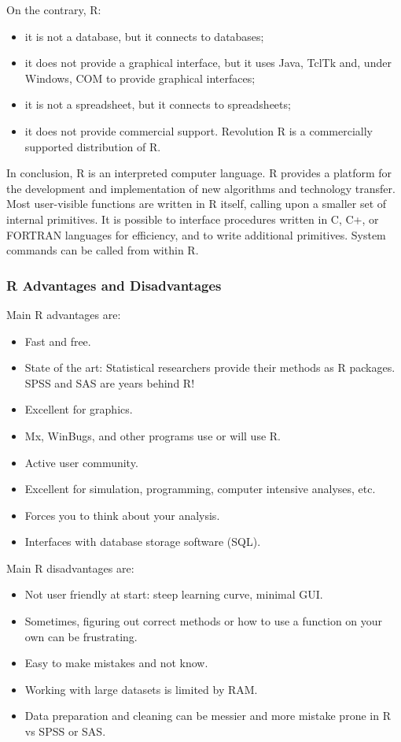 \documentclass[]{book}
\providecommand{\tightlist}{%
  \setlength{\itemsep}{0pt}\setlength{\parskip}{0pt}}
\def\tightlist{}
\begin{document}
On the contrary, R:

\begin{itemize}
\tightlist
\item
  it is not a database, but it connects to databases;
\item
  it does not provide a graphical interface, but it uses Java, TclTk
  and, under Windows, COM to provide graphical interfaces;
\item
  it is not a spreadsheet, but it connects to spreadsheets;
\item
  it does not provide commercial support. Revolution R is a commercially
  supported distribution of R.
\end{itemize}

In conclusion, R is an interpreted computer language. R provides a
platform for the development and implementation of new algorithms and
technology transfer. Most user-visible functions are written in R
itself, calling upon a smaller set of internal primitives. It is
possible to interface procedures written in C, C+, or FORTRAN languages
for efficiency, and to write additional primitives. System commands can
be called from within R.

\subsubsection{R Advantages and
Disadvantages}\label{r-advantages-and-disadvantages}

Main R advantages are:

\begin{itemize}
\tightlist
\item
  Fast and free.
\item
  State of the art: Statistical researchers provide their methods as R
  packages. SPSS and SAS are years behind R!
\item
  Excellent for graphics.
\item
  Mx, WinBugs, and other programs use or will use R.
\item
  Active user community.
\item
  Excellent for simulation, programming, computer intensive analyses,
  etc.
\item
  Forces you to think about your analysis.
\item
  Interfaces with database storage software (SQL).
\end{itemize}

Main R disadvantages are:

\begin{itemize}
\tightlist
\item
  Not user friendly at start: steep learning curve, minimal GUI.
\item
  Sometimes, figuring out correct methods or how to use a function on
  your own can be frustrating.
\item
  Easy to make mistakes and not know.
\item
  Working with large datasets is limited by RAM.
\item
  Data preparation and cleaning can be messier and more mistake prone in
  R vs SPSS or SAS.
\end{itemize}
\end{document}
